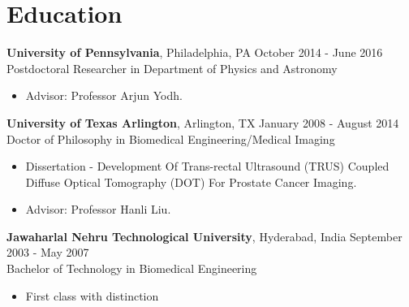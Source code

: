 \documentclass{my_cv}
\begin{document}
\section{Education}
\begin{flushleft}  
\textbf{University of Pennsylvania}, Philadelphia, PA  \hfill October 2014 - June 2016 \\ 
Postdoctoral Researcher in Department of Physics and Astronomy \\ 
\vspace{-3mm}
\begin{itemize}\itemsep -2pt
\item Advisor: Professor Arjun Yodh.
\end{itemize}

\textbf{University of Texas Arlington}, Arlington, TX \hfill January 2008 - August 2014 \\ 
Doctor of Philosophy in Biomedical Engineering/Medical Imaging \\
\vspace{-3mm}
\begin{itemize}\itemsep -2pt
\item Dissertation -  Development Of Trans-rectal Ultrasound (TRUS) Coupled Diffuse Optical Tomography (DOT) For Prostate Cancer Imaging.
\item Advisor: Professor Hanli Liu.
\end{itemize}
 
\textbf{Jawaharlal Nehru Technological University}, Hyderabad, India \hfill September 2003 - May 2007\\
Bachelor of Technology in Biomedical Engineering \\ 
\vspace{-3mm}
\begin{itemize}
\setlength\itemsep{0em} 
\item First class with distinction
\end{itemize}
\end{flushleft}  


 
\vspace{-7mm}%

\end{document}
